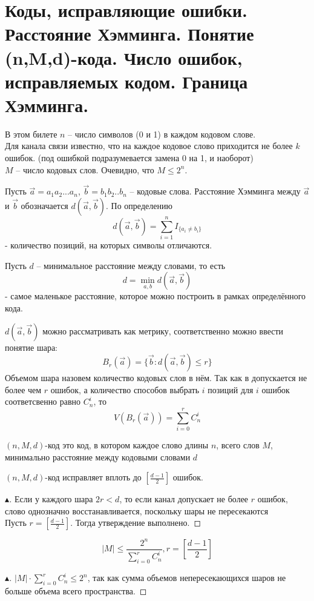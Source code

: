 \section{Коды, исправляющие ошибки. Расстояние Хэмминга. Понятие (n,M,d)-кода. Число ошибок, исправляемых кодом. Граница Хэмминга.}
В этом билете $n$ -- число символов (0 и 1) в каждом кодовом слове.\\
Для канала связи известно, что на каждое кодовое слово приходится не более $k$ ошибок. (под ошибкой подразумевается замена 0 на 1, и наоборот)\\
$M$ -- число кодовых слов. Очевидно, что $M \leq 2^n$.
\begin{definition}
    Пусть $\Vec{a} = a_1 a_2 ... a_n$, $\Vec{b} = b_1 b_2 .. b_n$ -- кодовые слова. Расстояние Хэмминга между $\Vec{a}$ и $\Vec{b}$ обозначается $d(\Vec{a}, \Vec{b})$. По определению
    $$d(\Vec{a}, \Vec{b}) = \sum_{i = 1}^{n} I_{\{a_i \neq b_i\}}$$
    - количество позиций, на которых символы отличаются.
\end{definition}
Пусть $d$ -- минимальное расстояние между словами, то есть
$$d = \min_{a, b} d(\Vec{a}, \Vec{b})$$ - самое маленькое расстояние, которое можно построить в рамках определённого кода.
\begin{note}
    $d(\Vec{a}, \Vec{b})$ можно рассматривать как метрику, соответственно можно ввести понятие шара: 
    $$B_r(\Vec{a}) = \{\Vec{b}: d(\Vec{a}, \Vec{b}) \leq r\}$$
    Объемом шара назовем количество кодовых слов в нём. Так как в допускается не более чем $r$ ошибок, а количество способов выбрать $i$ позиций для $i$ ошибок соответсвенно равно $C_{n}^{i}$, то $$V(B_r(\Vec{a})) = \sum_{i=0}^{r} C_{n}^{i}$$
\end{note}
\begin{definition} $(n, M, d)$-код это код, в котором каждое слово длины $n$, всего слов $M$, минимально расстояние между кодовыми словами $d$
\end{definition}
\begin{proposition}$(n, M, d)$-код исправляет вплоть до $[\frac{d-1}{2}]$ ошибок.
\end{proposition}
\begin{proof}[$\blacktriangle$]
    Если у каждого шара $2r < d$, то если канал допускает не более $r$ ошибок, слово однозначно восстанавливается, поскольку шары не пересекаются\\
    Пусть $r = [\frac{d-1}{2}]$. Тогда утверждение выполнено.
\end{proof}
\begin{note}
    $$|M| \leq \frac{2^n}{\sum \limits_{i=0}^{r} C_n^i}, r = \left[ \frac{d-1}{2} \right] $$
    \begin{proof}[$\blacktriangle$]
        $|M| \cdot \sum \limits_{i=0}^{r} C_n^i \leq 2^n$, так как сумма объемов непересекающихся шаров не больше объема всего пространства.
    \end{proof}
\end{note}


